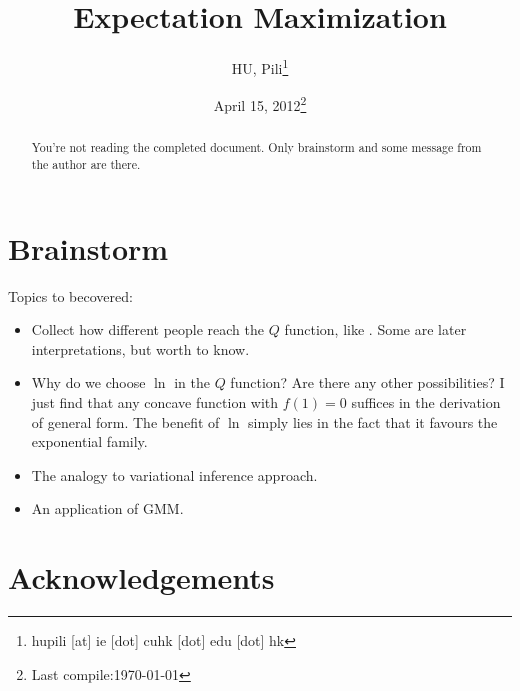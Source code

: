 


\author{HU, Pili\thanks{hupili [at] ie [dot] cuhk [dot] edu [dot] hk}}

\title{Expectation Maximization}
\date{April 15, 2012\thanks{Last compile:\today}}



\maketitle
\begin{abstract}
	You're not reading the completed document. Only 
	brainstorm and some message from the author are there.  
\end{abstract}

\pagebreak
\tableofcontents
\pagebreak



\section{Brainstorm}

Topics to becovered:
\begin{itemize}
	\item Collect how different people reach the $Q$ function, 
		like \cite{dempster1977em}\cite{bishop2006pattern}\cite{borman2004-emtut}. 
		Some are later interpretations, but worth to know. 
	\item Why do we choose $\ln$ in the $Q$ function? 
		Are there any other possibilities? I just find that any 
		concave function with $f(1)=0$ suffices in the derivation of 
		general form. The benefit of $\ln$ simply lies in the fact 
		that it favours the exponential family. 
	\item The analogy to variational inference approach. 
	\item An application of GMM. 
\end{itemize}






\section*{Acknowledgements}

